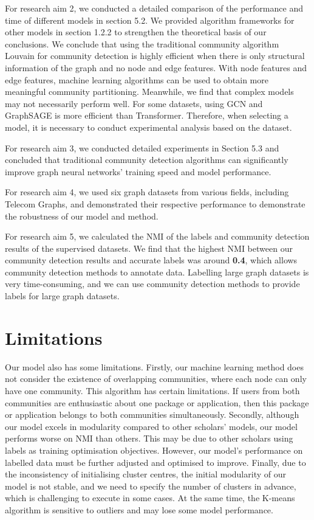 \documentclass[ %
                    author={Tengyao Tu},
                supervisor={Dr. James Pope},
                    degree={MSc},
                     title={A New Perspective on Graph Community Detection: Combining Traditional Methods with Deep Learning Approaches},
                  subtitle={Applying to Telecom Networks and Diverse Datasets},
                      type={},
                      year={2024}]{dissertation}
\begin{document}
For research aim 2, we conducted a detailed comparison of the performance and time of different models in section 5.2. We provided algorithm frameworks for other models in section 1.2.2 to strengthen the theoretical basis of our conclusions. We conclude that using the traditional community algorithm Louvain for community detection is highly efficient when there is only structural information of the graph and no node and edge features. With node features and edge features, machine learning algorithms can be used to obtain more meaningful community partitioning. Meanwhile, we find that complex models may not necessarily perform well. For some datasets, using GCN and GraphSAGE is more efficient than Transformer. Therefore, when selecting a model, it is necessary to conduct experimental analysis based on the dataset.

For research aim 3, we conducted detailed experiments in Section 5.3 and concluded that traditional community detection algorithms can significantly improve graph neural networks' training speed and model performance.

For research aim 4, we used six graph datasets from various fields, including Telecom Graphs, and demonstrated their respective performance to demonstrate the robustness of our model and method.

For research aim 5, we calculated the NMI of the labels and community detection results of the supervised datasets. We find that the highest NMI between our community detection results and accurate labels was around \textbf{0.4}, which allows community detection methods to annotate data. Labelling large graph datasets is very time-consuming, and we can use community detection methods to provide labels for large graph datasets.
\section{Limitations}
Our model also has some limitations. Firstly, our machine learning method does not consider the existence of overlapping communities, where each node can only have one community. This algorithm has certain limitations. If users from both communities are enthusiastic about one package or application, then this package or application belongs to both communities simultaneously. Secondly, although our model excels in modularity compared to other scholars' models, our model performs worse on NMI than others. This may be due to other scholars using labels as training optimisation objectives. However, our model's performance on labelled data must be further adjusted and optimised to improve. Finally, due to the inconsistency of initialising cluster centres, the initial modularity of our model is not stable, and we need to specify the number of clusters in advance, which is challenging to execute in some cases. At the same time, the K-means algorithm is sensitive to outliers and may lose some model performance.
\end{document}
